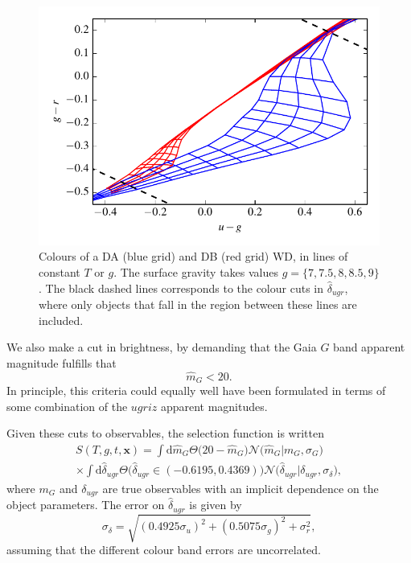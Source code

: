 \documentclass[fleqn,usenatbib]{mnras}
\newcommand{\Teff}{T}
\newcommand{\logg}{g}
\newcommand{\de}{\text{d}}
\begin{document}
\begin{figure}
	\includegraphics[width=\columnwidth]{colors_cut.pdf}
    \caption{Colours of a DA (blue grid) and DB (red grid) WD, in lines of constant $\Teff$ or $\logg$. The surface gravity takes values $\logg = \{7,7.5,8,8.5,9\}$. The black dashed lines corresponds to the colour cuts in $\hat{\delta}_{ugr}$, where only objects that fall in the region between these lines are included.}
    \label{fig:colors_cut}
\end{figure}

We also make a cut in brightness, by demanding that the Gaia $G$ band apparent magnitude fulfills that
\begin{equation}
	\hat{m}_G < 20.
\end{equation}
In principle, this criteria could equally well have been formulated in terms of some combination of the $ugriz$ apparent magnitudes.

Given these cuts to observables, the selection function is written
\begin{equation}\label{eq:selection}
\begin{split}
	S(\Teff,\logg,t,\mathbf{x}) = 
    	      \int \de \hat{m}_G \Theta \big( 20-\hat{m}_G \big)\mathcal{N}\big( \hat{m}_G | m_G,\sigma_G \big) \\
    \times \int \de \hat{\delta}_{ugr} \Theta \big( \hat{\delta}_{ugr} \in (-0.6195,0.4369) \big) \mathcal{N}\big( \hat{\delta}_{ugr} | \delta_{ugr},\sigma_{\delta}\big),
\end{split}
\end{equation}
where $m_G$ and $\delta_{ugr}$ are true observables with an implicit dependence on the object parameters. The error on $\hat{\delta}_{ugr}$ is given by
\begin{equation}
	\sigma_\delta = \sqrt{ (0.4925 \sigma_u)^2 + (0.5075 \sigma_g)^2 + \sigma_r^2 },
\end{equation}
assuming that the different colour band errors are uncorrelated.
\end{document}
